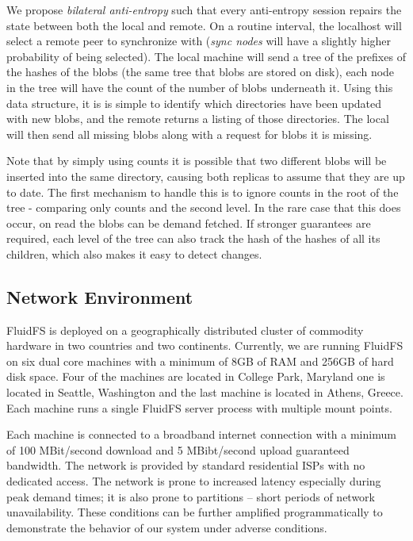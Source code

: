 \documentclass[letterpaper,twocolumn,10pt]{article}
\begin{document}
We propose \textit{bilateral anti-entropy} such that every anti-entropy
session repairs the state between both the local and remote.
On a routine interval, the localhost will select a remote peer to synchronize
with (\textit{sync nodes} will have a slightly higher probability of being
selected).
The local machine will send a tree of the prefixes of the hashes of the blobs
(the same tree that blobs are stored on disk), each node in the tree will
have the count of the number of blobs underneath it.
Using this data structure, it is is simple to identify which directories have
been updated with new blobs, and the remote returns a listing of those
directories.
The local will then send all missing blobs along with a request for blobs it
is missing.

Note that by simply using counts it is possible that two different blobs will
be inserted into the same directory, causing both replicas to assume that
they are up to date.
The first mechanism to handle this is to ignore counts in the root of the
tree - comparing only counts and the second level.
In the rare case that this does occur, on read the blobs can be demand
fetched.
If stronger guarantees are required, each level of the tree can also track
the hash of the hashes of all its children, which also makes it easy to
detect changes.

\subsection*{Network Environment}

FluidFS is deployed on a geographically distributed cluster of commodity
hardware in two countries and two continents.
Currently, we are running FluidFS on six dual core machines with a minimum of
8GB of RAM and 256GB of hard disk space.
Four of the machines are located in College Park, Maryland one is located in
Seattle, Washington and the last machine is located in Athens, Greece.
Each machine runs a single FluidFS server process with multiple mount points.

Each machine is connected to a broadband internet connection with a minimum
of 100 MBit/second download and 5 MBibt/second upload guaranteed bandwidth.
The network is provided by standard residential ISPs with no dedicated
access.
The network is prone to increased latency especially during peak demand
times; it is also prone to partitions -- short periods of network
unavailability.
These conditions can be further amplified programmatically to demonstrate the
behavior of our system under adverse conditions.
\end{document}
